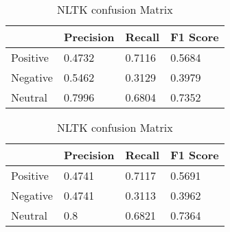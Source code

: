         \begin{table}[h]
        \centering
            \begin{subtable}{\textwidth}
                \centering
                \begin{tabular}{|l|l|l|l|} 
                \hline
                         & Precision                                   & Recall                                      & F1 Score                                     \\ 
                \hline
                Positive & {0.4732} & {0.7116} & {0.5684}  \\ 
                \hline
                Negative & {0.5462} & {0.3129} & {0.3979}  \\ 
                \hline
                Neutral  & {0.7996} & {0.6804} & {0.7352}  \\
                \hline
                \end{tabular}
                \smallskip
                \caption{VADER sentiment confusion Matrix} \label{sub:sent_vader}
            \end{subtable}
            
            \bigskip
            
            \begin{subtable}{\textwidth}
                \centering
                \begin{tabular}{|l|l|l|l|} 
                \hline
                         & Precision                                                                      & Recall                                                                         & F1 Score                                                                        \\ 
                \hline
                Positive & {}{0.4741} & {0.7117}                                    & {}{0.5691}  \\ 
                \hline
                Negative & {}{0.4741} & {}{0.3113} & {}{0.3962}  \\ 
                \hline
                Neutral  & {}{0.8}      & {0.6821}                                    & {}{0.7364}  \\
                \hline
                \end{tabular}
                \smallskip
                \caption{NLTK confusion Matrix} \label{sub:sent_NLTK}
            \end{subtable}
            
            \bigskip
            

\end{table}
